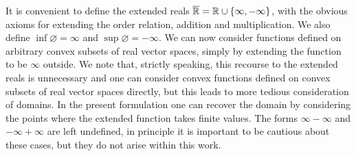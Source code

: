 It is convenient to define the extended reals $\overline{\mathbb{R}} = \mathbb{R} \cup \{\infty, -\infty\}$, with the obvious axioms for extending the order relation, addition and multiplication. We also define $\inf\varnothing = \infty$ and $\sup\varnothing = -\infty$.
We can now consider functions defined on arbitrary convex subsets of real vector spaces, simply by extending the function to be $\infty$ outside. We note that, strictly speaking, this recourse to the extended reals is unnecessary and one can consider convex functions defined on convex subsets of real vector spaces directly, but this leads to more tedious consideration of domains. In the present formulation one can recover the domain by considering the points where the extended function takes finite values. The forms $\infty-\infty$ and $-\infty +\infty$ are left undefined, in principle it is important to be cautious about these cases, but they do not arise within this work.

